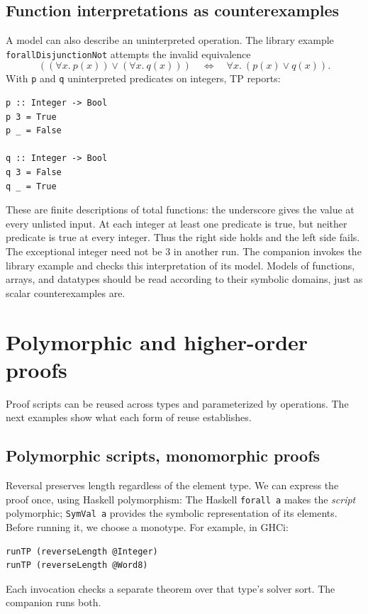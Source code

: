 \documentclass[review]{jfp-epi}
\newcommand{\code}[1]{\texttt{#1}}
\begin{document}
\subsection{Function interpretations as counterexamples}

A model can also describe an uninterpreted operation. The library example
\code{forall\allowbreak Disjunction\allowbreak Not} attempts the invalid equivalence
\[
 ((\forall x.\ p(x))\lor(\forall x.\ q(x)))
 \quad\Longleftrightarrow\quad \forall x.\ (p(x)\lor q(x)).
\]
With \code{p} and \code{q} uninterpreted predicates on integers, TP reports:
\begin{lstlisting}[style=output]
p :: Integer -> Bool
p 3 = True
p _ = False

q :: Integer -> Bool
q 3 = False
q _ = True
\end{lstlisting}
These are finite descriptions of total functions: the underscore gives the
value at every unlisted input. At each integer at least one predicate is true,
but neither predicate is true at every integer. Thus the right side holds and
the left side fails. The exceptional integer need not be 3 in another run.
The companion invokes the library example and checks this interpretation of its
model. Models of functions, arrays, and datatypes should be read according to
their symbolic domains, just as scalar counterexamples are.


\section{Polymorphic and higher-order proofs}
\label{sec:higherorder}

Proof scripts can be reused across types and parameterized by operations.
The next examples show what each form of reuse establishes.

\subsection{Polymorphic scripts, monomorphic proofs}
\label{sec:polymorphic}

Reversal preserves length regardless of the element type. We can express the
proof once, using Haskell polymorphism:
The Haskell \code{forall a} makes the \emph{script} polymorphic; \code{SymVal a}
provides the symbolic representation of its elements. Before running it, we
choose a monotype. For example, in GHCi:
\begin{lstlisting}
runTP (reverseLength @Integer)
runTP (reverseLength @Word8)
\end{lstlisting}
Each invocation checks a separate theorem over that type's solver sort. The
companion runs both.
\end{document}
